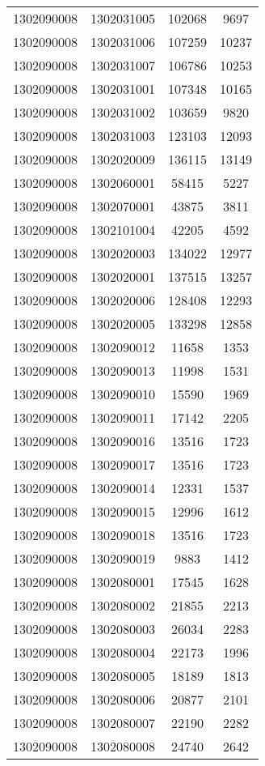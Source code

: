 \begin{longtable}[h]{llcc}
		1302090008 & 1302031005 & 102068 & 9697\\
		1302090008 & 1302031006 & 107259 & 10237\\
		1302090008 & 1302031007 & 106786 & 10253\\
		1302090008 & 1302031001 & 107348 & 10165\\
		1302090008 & 1302031002 & 103659 & 9820\\
		1302090008 & 1302031003 & 123103 & 12093\\
		1302090008 & 1302020009 & 136115 & 13149\\
		1302090008 & 1302060001 & 58415 & 5227\\
		1302090008 & 1302070001 & 43875 & 3811\\
		1302090008 & 1302101004 & 42205 & 4592\\
		1302090008 & 1302020003 & 134022 & 12977\\
		1302090008 & 1302020001 & 137515 & 13257\\
		1302090008 & 1302020006 & 128408 & 12293\\
		1302090008 & 1302020005 & 133298 & 12858\\
		1302090008 & 1302090012 & 11658 & 1353\\
		1302090008 & 1302090013 & 11998 & 1531\\
		1302090008 & 1302090010 & 15590 & 1969\\
		1302090008 & 1302090011 & 17142 & 2205\\
		1302090008 & 1302090016 & 13516 & 1723\\
		1302090008 & 1302090017 & 13516 & 1723\\
		1302090008 & 1302090014 & 12331 & 1537\\
		1302090008 & 1302090015 & 12996 & 1612\\
		1302090008 & 1302090018 & 13516 & 1723\\
		1302090008 & 1302090019 & 9883 & 1412\\
		1302090008 & 1302080001 & 17545 & 1628\\
		1302090008 & 1302080002 & 21855 & 2213\\
		1302090008 & 1302080003 & 26034 & 2283\\
		1302090008 & 1302080004 & 22173 & 1996\\
		1302090008 & 1302080005 & 18189 & 1813\\
		1302090008 & 1302080006 & 20877 & 2101\\
		1302090008 & 1302080007 & 22190 & 2282\\
		1302090008 & 1302080008 & 24740 & 2642\\

\end{longtable}
